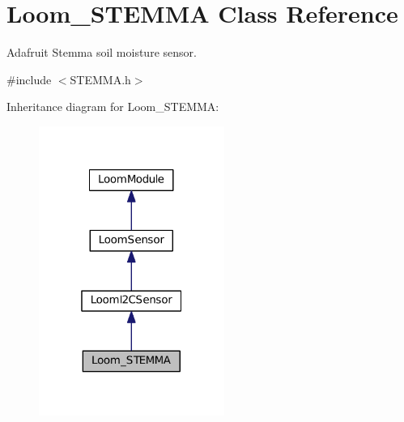 \hypertarget{class_loom___s_t_e_m_m_a}{}\section{Loom\+\_\+\+S\+T\+E\+M\+MA Class Reference}
\label{class_loom___s_t_e_m_m_a}


Adafruit Stemma soil moisture sensor.  




{\ttfamily \#include $<$S\+T\+E\+M\+M\+A.\+h$>$}



Inheritance diagram for Loom\+\_\+\+S\+T\+E\+M\+MA\+:\nopagebreak
\begin{figure}[H]
\begin{center}
\leavevmode
\includegraphics[width=172pt]{class_loom___s_t_e_m_m_a__inherit__graph}
\end{center}
\end{figure}
